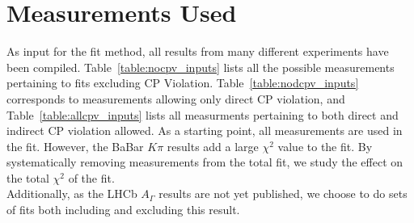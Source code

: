 \section{Measurements Used}
\label{sec:measurements}

As input for the fit method, all results from many different experiments have been compiled. 
Table~\ref{table:nocpv_inputs} lists all the possible
measurements pertaining to fits excluding CP Violation. Table~\ref{table:nodcpv_inputs}
corresponds to measurements allowing only direct CP violation, and 
Table~\ref{table:allcpv_inputs} lists all measurments pertaining to both
direct and indirect CP violation allowed. As a starting point, all measurements are used
in the fit. However, the BaBar $K\pi$ results add a large $\chi^2$ value to the fit. By systematically
removing measurements from the total fit, we study the effect on the total $\chi^2$ of the fit.\\

Additionally, as the LHCb $A_\Gamma$ results are not yet published, we choose to do sets of fits both
including and excluding this result. 
%



